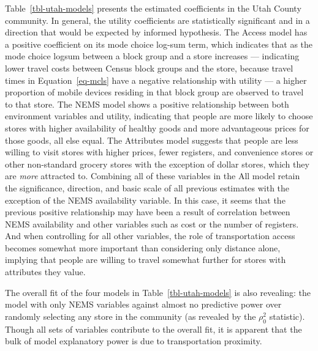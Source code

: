 \documentclass[
  letterpaper,
  number,
  review,
  doubleblind,
  3p]{elsarticle}
\begin{document}
Table~\ref{tbl-utah-models} presents the estimated coefficients in the
Utah County community. In general, the utility coefficients are
statistically significant and in a direction that would be expected by
informed hypothesis. The Access model has a positive coefficient on its
mode choice log-sum term, which indicates that as the mode choice logsum
between a block group and a store increases --- indicating lower travel
costs between Census block groups and the store, because travel times in
Equation~\ref{eq-mcls} have a negative relationship with utility --- a
higher proportion of mobile devices residing in that block group are
observed to travel to that store. The NEMS model shows a positive
relationship between both environment variables and utility, indicating
that people are more likely to choose stores with higher availability of
healthy goods and more advantageous prices for those goods, all else
equal. The Attributes model suggests that people are less willing to
visit stores with higher prices, fewer registers, and convenience stores
or other non-standard grocery stores with the exception of dollar
stores, which they are \emph{more} attracted to. Combining all of these
variables in the All model retain the significance, direction, and basic
scale of all previous estimates with the exception of the NEMS
availability variable. In this case, it seems that the previous positive
relationship may have been a result of correlation between NEMS
availability and other variables such as cost or the number of
registers. And when controlling for all other variables, the role of
transportation access becomes somewhat more important than considering
only distance alone, implying that people are willing to travel somewhat
further for stores with attributes they value.

The overall fit of the four models in Table~\ref{tbl-utah-models} is
also revealing: the model with only NEMS variables against almost no
predictive power over randomly selecting any store in the community (as
revealed by the \(\rho_0^2\) statistic). Though all sets of variables
contribute to the overall fit, it is apparent that the bulk of model
explanatory power is due to transportation proximity.
\end{document}
